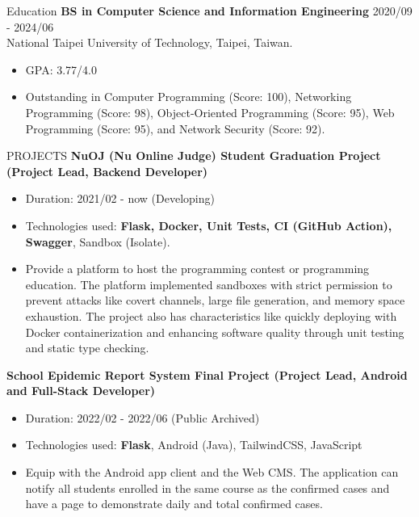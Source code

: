 \documentclass{resume} %
\begin{document}

\begin{rSection}{Education}
{\bf BS in Computer Science and Information Engineering} \hfill {2020/09 - 2024/06} \\
{National Taipei University of Technology, Taipei, Taiwan.}
\begin{itemize}
  \item GPA: 3.77/4.0
  \item {
    Outstanding in Computer Programming (Score: 100), 
    Networking Programming (Score: 98), 
    Object-Oriented Programming (Score: 95), 
    Web Programming (Score: 95),
    and Network Security (Score: 92).
  }
\end{itemize}
\end{rSection}

\begin{rSection}{PROJECTS}
{\bf NuOJ (Nu Online Judge) \hfill {Student Graduation Project (Project Lead, Backend Developer)}}
    \begin{itemize}
        \item {Duration: 2021/02 - now (Developing)}
        \item {Technologies used: {\bf Flask, Docker, Unit Tests, CI (GitHub Action), Swagger}, Sandbox (Isolate).}
        \item {Provide a platform to host the programming contest or programming education. The platform implemented sandboxes with strict permission to prevent attacks like covert channels, large file generation, and memory space exhaustion. The project also has characteristics like quickly deploying with Docker containerization and enhancing software quality through unit testing and static type checking.}
    \end{itemize}

{\bf School Epidemic Report System \hfill {Final Project (Project Lead, Android and Full-Stack Developer)}}
    \begin{itemize}
        \item {Duration: 2022/02 - 2022/06 (Public Archived)}
        \item {Technologies used: {\bf Flask}, Android (Java), TailwindCSS, JavaScript}
        \item {Equip with the Android app client and the Web CMS. The application can notify all students enrolled in the same course as the confirmed cases and have a page to demonstrate daily and total confirmed cases.}
    \end{itemize}
\end{rSection}
\end{document}
